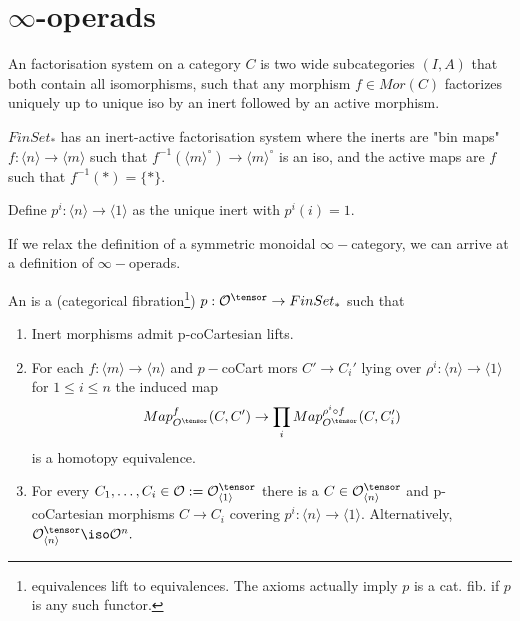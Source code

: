 \section{$\infty$-operads}

\begin{definition}
    An  factorisation system on a category $C$ is two wide subcategories $(I,A)$ that both contain all isomorphisms, such that any morphism $f\in Mor(C)$ factorizes uniquely up to unique iso by an inert followed by an active morphism.
\end{definition}

\begin{example}
    $FinSet_*$ has an inert-active factorisation system where the inerts are "bin maps" $f:\langle n\rangle\rightarrow \langle m \rangle$ such that $f^{-1}(\langle m \rangle^\circ)\rightarrow \langle m \rangle^\circ$ is an iso, and the active maps are $f$ such that $f^{-1}(*)=\{*\}.$

    Define $p^i:\langle n \rangle \rightarrow \langle 1 \rangle$ as the unique inert with $p^i(i)=1.$
\end{example}

If we relax the definition of a symmetric monoidal $\infty-$category, we can arrive at a definition of $\infty-$operads.

\begin{definition}
    An  is a (categorical fibration\footnote{equivalences lift to equivalences. The axioms actually imply $p$ is a cat. fib. if $p$ is any such functor.}) $p:\mathcal{O}^\tensor \rightarrow FinSet_*$ such that
    \begin{enumerate}
        \item Inert morphisms admit p-coCartesian lifts.
        \item For each $f:\langle m \rangle \rightarrow \langle n \rangle$ and $p-$coCart mors $C'\rightarrow C_i'$ lying over $\rho^i:\langle n \rangle \rightarrow\langle 1 \rangle$ for $1\leq i \leq n$ the induced map 
        $$Map_{O^\tensor}^f(C,C')\rightarrow\prod_i Map_{O^\tensor}^{\rho^i \circ f}(C,C_i')$$
        is a homotopy equivalence.
        \item For every $C_1,\dots,C_i\in \mathcal{O}:=\mathcal{O}^\tensor_{\langle 1 \rangle}$ there is a $C\in \mathcal{O}^\tensor_{\langle n \rangle}$ and p-coCartesian morphisms $C\rightarrow C_i$ covering $p^i:\langle n \rangle \rightarrow \langle 1 \rangle$. Alternatively, $\mathcal{O}^\tensor_{\langle n \rangle}\iso \mathcal{O}^n.$
    \end{enumerate}
\end{definition}

